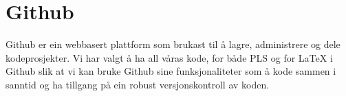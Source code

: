 \section{Github}
\thispagestyle{fancy}

Github er ein webbasert plattform som brukast til å lagre, administrere og dele kodeprosjekter. 
Vi har valgt å ha all våras kode, for både PLS og for LaTeX i Github slik at vi kan bruke Github sine funksjonaliteter som å kode sammen i sanntid og ha tillgang på ein robust versjonskontroll av koden.


